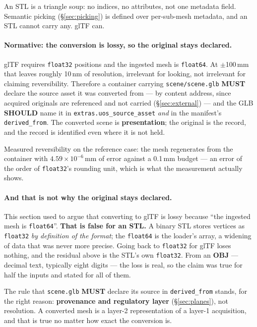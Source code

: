\documentclass[11pt,a4paper]{article}
\newcommand{\MUST}{\textcolor{uosred}{\textbf{MUST}}}
\newcommand{\SHOULD}{\textcolor{uosamber}{\textbf{SHOULD}}}
\newcommand{\code}[1]{\texttt{\small #1}}
\begin{document}
An STL is a triangle soup: no indices, no attributes, not one metadata field. Semantic
picking (\S\ref{sec:picking}) is defined over per-sub-mesh metadata, and an STL cannot
carry any. glTF can.

\paragraph{Normative: the conversion is lossy, so the original stays declared.}
glTF requires \code{float32} positions and the ingested mesh is \code{float64}. At
$\pm$100\,mm that leaves roughly 10\,nm of resolution, irrelevant for looking, not
irrelevant for claiming reversibility. Therefore a container carrying
\code{scene/scene.glb} \MUST{} declare the source asset it was converted from --- by
content address, since acquired originals are referenced and not carried
(\S\ref{sec:external}) --- and the GLB \SHOULD{} name it in \code{extras.uos\_source\_asset}
\emph{and} in the manifest's \code{derived\_from}. The converted scene is
\textbf{presentation}; the original is the record, and the record is identified even where
it is not held.

\vspace{6px}

Measured reversibility on the reference case: the mesh regenerates from the container with
$4.59\times10^{-6}$\,mm of error against a 0.1\,mm budget --- an error of the order of
\code{float32}'s rounding unit, which is what the measurement actually shows.

\paragraph{And that is not why the original stays declared.}
This section used to argue that converting to glTF is lossy because ``the ingested mesh is
\code{float64}''. \textbf{That is false for an STL.} A binary STL stores vertices as
\code{float32} \emph{by definition of the format}; the \code{float64} is the loader's array,
a widening of data that was never more precise. Going back to \code{float32} for glTF loses
nothing, and the residual above is the STL's own \code{float32}. From an \textbf{OBJ} ---
decimal text, typically eight digits --- the loss is real, so the claim was true for half
the inputs and stated for all of them.

The rule that \code{scene.glb} \MUST{} declare its source in \code{derived\_from} stands,
for the right reason: \textbf{provenance and regulatory layer} (\S\ref{sec:planes}), not
resolution. A converted mesh is a layer-2 representation of a layer-1 acquisition, and that
is true no matter how exact the conversion is.
\end{document}

